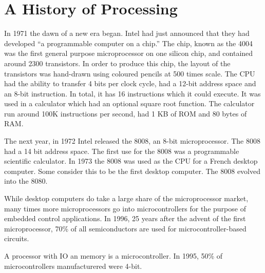 \chapter{A History of Processing}
In 1971 the dawn of a new era began. Intel had just announced that they had developed ``a programmable computer on a chip.'' The chip, known as the 4004 was the first general purpose microprocessor on one silicon chip, and contained around 2300 transistors. In order to produce this chip, the layout of the transistors was hand-drawn using coloured pencils at 500 times scale. The CPU had the ability to transfer 4 bits per clock cycle, had a 12-bit address space and an 8-bit instruction. In total, it has 16 instructions which it could execute. It was used in a calculator which had an optional square root function. The calculator run around 100K instructions per second, had 1 KB of ROM and 80 bytes of RAM. 

The next year, in 1972 Intel released the 8008, an 8-bit microprocessor. The 8008 had a 14 bit address space. The first use for the 8008 was a programmable scientific calculator. In 1973 the 8008 was used as the CPU for a French desktop computer. Some consider this to be the first desktop computer. The 8008 evolved into the 8080. 

While desktop computers do take a large share of the microprocessor market, many times more microprocessors go into microcontrollers for the purpose of embedded control applications. In 1996, 25 years after the advent of the first microprocessor, 70\% of all semiconductors are used for microcontroller-based circuits. 

A processor with IO an memory is a microcontroller. In 1995, 50\% of microcontrollers manufacturered were 4-bit. 

